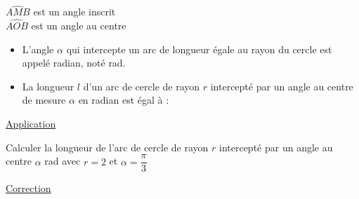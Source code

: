 \documentclass[12pt,a4paper]{article}
\begin{document}
\noindent \textcolor{monRouge}{$\widehat{AMB}$} est un angle inscrit \\
\noindent \textcolor{monRouge}{$\widehat{AOB}$} est un angle au centre

\begin{itemize}
    \item[$*_{3}$] L'angle \textcolor{monRouge}{$\alpha$} qui intercepte un arc de longueur égale au rayon du cercle est appelé \textcolor{monRouge}{radian}, noté \textcolor{monRouge}{rad}.
    
    \item[$*_{4}$] La longueur \textcolor{monRouge}{$l$} d'un arc de cercle de rayon $r$ intercepté par un angle au centre de mesure \textcolor{monRouge}{$\alpha$} en radian est égal à :
\end{itemize}

\begin{center}
    \begin{minipage}{0.4\textwidth}
        \centering
    \end{minipage}
    \begin{minipage}{0.4\textwidth}
        \centering
        \color{monRouge}
        \setlength{\fboxrule}{1pt}
    \end{minipage}
\end{center}

\begin{center}
    \textcolor{monRouge}{\underline{\Large Application}}
\end{center}

\noindent Calculer la longueur de l'arc de cercle de rayon $r$ intercepté par un angle au centre $\alpha$ rad avec $r = 2$ et $\alpha = \dfrac{\pi}{3}$

\begin{center}
    \textcolor{monRouge}{\underline{Correction}}
\end{center}
\end{document}
